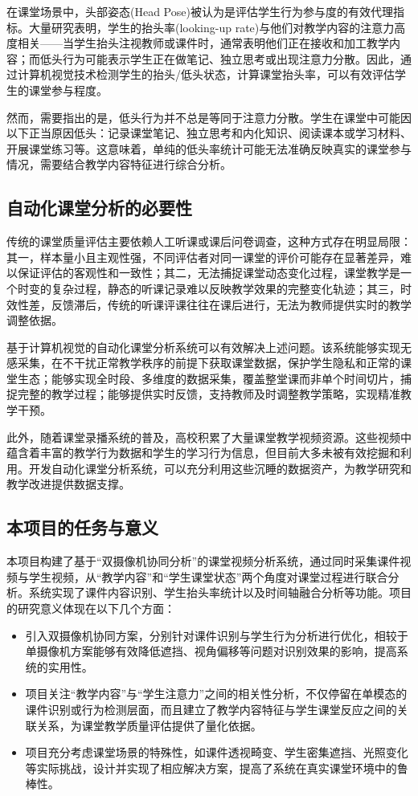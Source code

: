\documentclass[12pt,hyperref,a4paper,UTF8]{ctexart}
\begin{document}
在课堂场景中，头部姿态(Head Pose)被认为是评估学生行为参与度的有效代理指标。大量研究表明，学生的抬头率(looking-up rate)与他们对教学内容的注意力高度相关——当学生抬头注视教师或课件时，通常表明他们正在接收和加工教学内容；而低头行为可能表示学生正在做笔记、独立思考或出现注意力分散。因此，通过计算机视觉技术检测学生的抬头/低头状态，计算课堂抬头率，可以有效评估学生的课堂参与程度。

然而，需要指出的是，低头行为并不总是等同于注意力分散。学生在课堂中可能因以下正当原因低头：记录课堂笔记、独立思考和内化知识、阅读课本或学习材料、开展课堂练习等。这意味着，单纯的低头率统计可能无法准确反映真实的课堂参与情况，需要结合教学内容特征进行综合分析。

\subsection{自动化课堂分析的必要性}

传统的课堂质量评估主要依赖人工听课或课后问卷调查，这种方式存在明显局限：其一，样本量小且主观性强，不同评估者对同一课堂的评价可能存在显著差异，难以保证评估的客观性和一致性；其二，无法捕捉课堂动态变化过程，课堂教学是一个时变的复杂过程，静态的听课记录难以反映教学效果的完整变化轨迹；其三，时效性差，反馈滞后，传统的听课评课往往在课后进行，无法为教师提供实时的教学调整依据。

基于计算机视觉的自动化课堂分析系统可以有效解决上述问题。该系统能够实现无感采集，在不干扰正常教学秩序的前提下获取课堂数据，保护学生隐私和正常的课堂生态；能够实现全时段、多维度的数据采集，覆盖整堂课而非单个时间切片，捕捉完整的教学过程；能够提供实时反馈，支持教师及时调整教学策略，实现精准教学干预。

此外，随着课堂录播系统的普及，高校积累了大量课堂教学视频资源。这些视频中蕴含着丰富的教学行为数据和学生的学习行为信息，但目前大多未被有效挖掘和利用。开发自动化课堂分析系统，可以充分利用这些沉睡的数据资产，为教学研究和教学改进提供数据支撑。

\subsection{本项目的任务与意义}

本项目构建了基于“双摄像机协同分析”的课堂视频分析系统，通过同时采集课件视频与学生视频，从“教学内容”和“学生课堂状态”两个角度对课堂过程进行联合分析。系统实现了课件内容识别、学生抬头率统计以及时间轴融合分析等功能。项目的研究意义体现在以下几个方面：

\begin{itemize}
    \item 引入双摄像机协同方案，分别针对课件识别与学生行为分析进行优化，相较于单摄像机方案能够有效降低遮挡、视角偏移等问题对识别效果的影响，提高系统的实用性。

    \item 项目关注“教学内容”与“学生注意力”之间的相关性分析，不仅停留在单模态的课件识别或行为检测层面，而且建立了教学内容特征与学生课堂反应之间的关联关系，为课堂教学质量评估提供了量化依据。

    \item 项目充分考虑课堂场景的特殊性，如课件透视畸变、学生密集遮挡、光照变化等实际挑战，设计并实现了相应解决方案，提高了系统在真实课堂环境中的鲁棒性。
\end{itemize}
\end{document}
